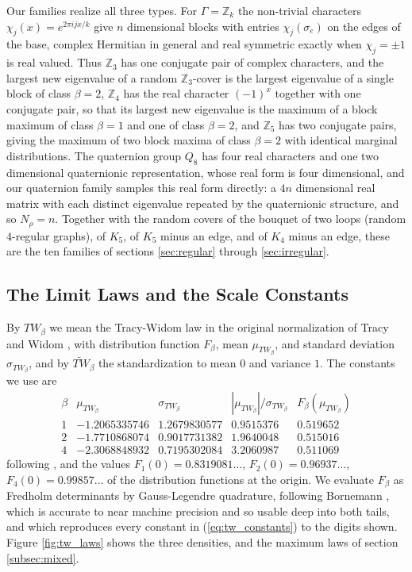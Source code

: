 \documentclass[12pt,oneside,english]{amsart}
\numberwithin{equation}{section}
\numberwithin{figure}{section}
\numberwithin{table}{section}
\theoremstyle{plain}
\numberwithin{thm}{section}
\theoremstyle{plain}
\theoremstyle{plain}
\theoremstyle{plain}
\theoremstyle{definition}
\theoremstyle{definition}
\theoremstyle{definition}
\theoremstyle{remark}
\begin{document}
Our families realize all three types. For $\Gamma=\mathbb{Z}_{k}$
the non-trivial characters $\chi_{j}(x)=e^{2\pi ijx/k}$ give $n$
dimensional blocks with entries $\chi_{j}(\sigma_{e})$ on the edges
of the base, complex Hermitian in general and real symmetric exactly
when $\chi_{j}=\pm1$ is real valued. Thus $\mathbb{Z}_{3}$ has one
conjugate pair of complex characters, and the largest new eigenvalue
of a random $\mathbb{Z}_{3}$-cover is the largest eigenvalue of a
single block of class $\beta=2$, $\mathbb{Z}_{4}$ has the real character
$(-1)^{x}$ together with one conjugate pair, so that its largest new
eigenvalue is the maximum of a block maximum of class $\beta=1$ and
one of class $\beta=2$, and $\mathbb{Z}_{5}$ has two conjugate pairs,
giving the maximum of two block maxima of class $\beta=2$ with identical
marginal distributions. The quaternion group $Q_{8}$ has four real
characters and one two dimensional quaternionic representation, whose
real form is four dimensional, and our quaternion family samples this
real form directly: a $4n$ dimensional real matrix with each distinct
eigenvalue repeated by the quaternionic structure, and so $N_{\rho}=n$.
Together with the random covers of the bouquet of two loops (random
$4$-regular graphs), of $K_{5}$, of $K_{5}$ minus an edge, and of
$K_{4}$ minus an edge, these are the ten families of sections \ref{sec:regular}
through \ref{sec:irregular}.

\subsection{\label{subsec:laws}The Limit Laws and the Scale Constants}

By $TW_{\beta}$ we mean the Tracy-Widom law in the original normalization
of Tracy and Widom \cite{TracyWidom1994,TracyWidom1996}, with distribution
function $F_{\beta}$, mean $\mu_{TW_{\beta}}$, and standard deviation
$\sigma_{TW_{\beta}}$, and by $\widetilde{TW}_{\beta}$ the standardization
to mean $0$ and variance $1$. The constants we use are
\begin{equation}
\begin{array}{ccccc}
\beta & \mu_{TW_{\beta}} & \sigma_{TW_{\beta}} & \left|\mu_{TW_{\beta}}\right|/\sigma_{TW_{\beta}} & F_{\beta}(\mu_{TW_{\beta}})\\
1 & -1.2065335746 & 1.2679830577 & 0.9515376 & 0.519652\\
2 & -1.7710868074 & 0.9017731382 & 1.9640048 & 0.515016\\
4 & -2.3068848932 & 0.7195302084 & 3.2060987 & 0.511069
\end{array}\label{eq:tw_constants}
\end{equation}
following \cite{Bornemann2010Fredholm,Bornemann2010Review}, and the
values $F_{1}(0)=0.8319081\dots$, $F_{2}(0)=0.96937\dots$, $F_{4}(0)=0.99857\dots$
of the distribution functions at the origin. We evaluate $F_{\beta}$
as Fredholm determinants by Gauss-Legendre quadrature, following Bornemann
\cite{Bornemann2010Fredholm}, which is accurate to near machine precision
and so usable deep into both tails, and which reproduces every constant
in (\ref{eq:tw_constants}) to the digits shown. Figure \ref{fig:tw_laws}
shows the three densities, and the maximum laws of section \ref{subsec:mixed}.
\end{document}
